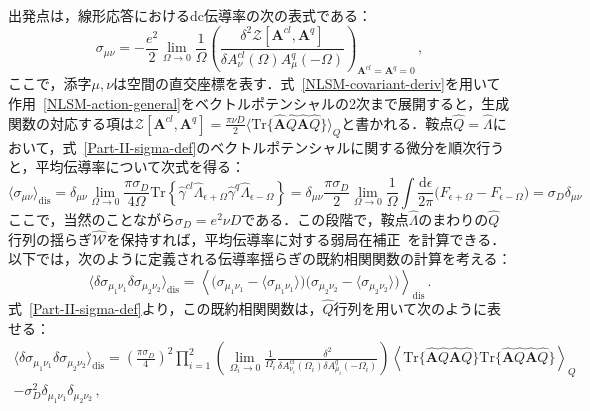 \documentclass[a4paper,11pt]{ltjsarticle}
\def\Tr{\mathrm{Tr}}
\def\d{\mathrm{d}}
\begin{document}
出発点は，線形応答における$\mathrm{dc}$伝導率の次の表式である：
\begin{equation}\label{Part-II-sigma-def}
\sigma_{\mu\nu}=-\frac{e^2}{2}\lim_{\Omega\to 0}\frac{1}{\Omega}
\left(\frac{\delta^{2}\mathcal{Z}[\mathbf{A}^{cl},\mathbf{A}^{q}]}
{\delta
A^{cl}_{\nu}(\Omega)A^{q}_{\mu}(-\Omega)}\right)_{\mathbf{A}^{cl}=\mathbf{A}^{q}=0}\,,
\end{equation}
ここで，添字$\mu,\nu$は空間の直交座標を表す．式~\eqref{NLSM-covariant-deriv}を用いて作用~\eqref{NLSM-action-general}をベクトルポテンシャルの2次まで展開すると，生成関数の対応する項は$\mathcal{Z}[\mathbf{A}^{cl},\mathbf{A}^{q}]=\frac{\pi\nu
D}{2}\big\langle\Tr\big\{\hat{\mathbf{A}}
\hat{Q}\hat{\mathbf{A}}\hat{Q}\big\}\big\rangle_{Q}$と書かれる．鞍点$\hat{Q}=\hat{\Lambda}$において，式~\eqref{Part-II-sigma-def}のベクトルポテンシャルに関する微分を順次行うと，平均伝導率について次式を得る：
\begin{equation}\label{NLSM-sigma-Drude}
\langle\sigma_{\mu\nu}\rangle_{\mathrm{dis}}=
\delta_{\mu\nu}\lim_{\Omega\to 0}\frac{\pi\sigma_{D}}{4\Omega}
\Tr\left\{\hat{\gamma}^{cl}\hat{\Lambda}_{\epsilon+\Omega}
\hat{\gamma}^{q}\hat{\Lambda}_{\epsilon-\Omega}\right\}=
\delta_{\mu\nu}\frac{\pi\sigma_{D}}{2}\lim_{\Omega\to0}
\frac{1}{\Omega}\int\frac{\d\epsilon}{2\pi}
\big(F_{\epsilon+\Omega}-F_{\epsilon-\Omega}\big)=\sigma_{D}\delta_{\mu\nu}
\end{equation}
ここで，当然のことながら$\sigma_D=e^2\nu D$である．この段階で，鞍点$\hat{\Lambda}$のまわりの$\hat Q$行列の揺らぎ$\hat{\mathcal{W}}$を保持すれば，平均伝導率に対する弱局在補正~\cite{Hikami:1981zz,Gor'kovLarkinKhmelnitskii,AAKL,Lee:1985zzc,ALW-book}を計算できる．以下では，次のように定義される伝導率揺らぎの既約相関関数の計算を考える：
$$\langle\delta\sigma_{\mu_{1}\nu_{1}}
\delta\sigma_{\mu_{2}\nu_{2}}\rangle_{\mathrm{dis}}=
\left\langle\big(\sigma_{\mu_{1}\nu_{1}}-\langle\sigma_{\mu_{1}\nu_{1}}\rangle\big)
\big(\sigma_{\mu_{2}\nu_{2}}-
\langle\sigma_{\mu_{2}\nu_{2}}\rangle\big)\right\rangle_{\mathrm{dis}}\,.$$
式~\eqref{Part-II-sigma-def}より，この既約相関関数は，$\hat Q$行列を用いて次のように表せる：
\begin{eqnarray}\label{Part-II-UCF-def}
\langle\delta\sigma_{\mu_{1}\nu_{1}}
\delta\sigma_{\mu_{2}\nu_{2}}\rangle_{\mathrm{dis}}=
\left(\frac{\pi\sigma_{D}}{4}\right)^{2}
\prod^{2}_{i=1}\left(\lim_{\Omega_{i}\to 0}
\frac{1}{\Omega_{i}}\frac{\delta^{2}}{\delta
A^{cl}_{\nu_{i}}(\Omega_{i})\delta
A^{q}_{\mu_{i}}(-\Omega_{i})}\right)
\left\langle\Tr\{\hat{\mathbf{A}}\hat{Q}\hat{\mathbf{A}}\hat{Q}\}
\Tr\{\hat{\mathbf{A}}\hat{Q}\hat{\mathbf{A}}\hat{Q}\}\right\rangle_{Q}\nonumber\\
-\sigma^{2}_{D} \delta_{\mu_{1}\nu_{1}}\delta_{\mu_{2}\nu_{2}}\,,
\end{eqnarray}
\end{document}
